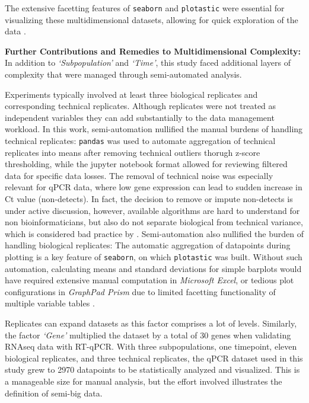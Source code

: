 The extensive facetting features of \texttt{seaborn} and \texttt{plotastic} were
essential for visualizing these multidimensional datasets, allowing for quick
exploration of the data \cite{waskomSeabornStatisticalData2021}.


\textbf{Further Contributions and Remedies to Multidimensional Complexity:}
In addition to \textit{`Subpopulation'} and \textit{`Time'}, this study faced
additional layers of complexity that were managed through semi-automated
analysis.

Experiments typically involved at least three biological replicates and
corresponding technical replicates. Although replicates were not treated as
independent variables 
they can add substantially to the data management workload. In this work,
semi-automation nullified the manual burdens of handling technical replicates:
\texttt{pandas} was used to automate aggregation of technical replicates into
means after removing technical outliers thorugh z-score thresholding, while the
jupyter notebook format allowed for reviewing filtered data for specific data
losses. The removal of technical noise was especially relevant for qPCR data,
where low gene expression can lead to sudden increase in Ct value (non-detects).
In fact, the decision to remove or impute non-detects is under active
discussion, however, available algorithms are hard to understand for non
bioinformaticians, but also do not separate biological from technical variance,
which is considered bad practice by
\citet{motulskyIntuitiveBiostatisticsNonmathematical2018}
\cite{mccallNondetectsQPCRData2014, sherinaMultipleImputationDirect2020}.
Semi-automation also nullified the burden of handling biological replicates: The
automatic aggregation of datapoints during plotting is a key feature of
\texttt{seaborn}, on which \texttt{plotastic} was built. Without such
automation, calculating means and standard deviations for simple barplots would
have required extensive manual computation in \textit{Microsoft Excel}, or
tedious plot configurations in \textit{GraphPad Prism} due to limited facetting
functionality of multiple variable tables \cite{GraphPadPrism102024}.

Replicates can expand datasets as this factor comprises a lot of levels.
Similarly, the factor \textit{`Gene'} multiplied the dataset by a total of 30
genes when validating RNAseq data with RT-qPCR. With three subpopulations, one
timepoint, eleven biological replicates, and three technical replicates, the
qPCR dataset used in this study grew to 2970 datapoints to be statistically
analyzed and visualized. This is a manageable size for manual analysis, but the
effort involved illustrates the definition of semi-big data.

